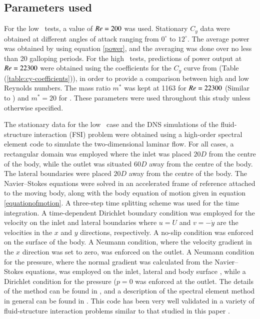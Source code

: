 \subsection{Parameters used} 
  
For the low \reynoldsnumber\ tests, a value of $Re=200$ was used. Stationary $C_y$ data were obtained at different angles of attack ranging from $0^\circ$ to $12^\circ$. The average power was obtained by using equation \ref{power}, and the averaging was done over no less than 20 galloping periods. For the high \reynoldsnumber\ tests, predictions of power output at $Re=22300$ were obtained using the coefficients for the $C_y$  curve from \citet{Parkinson1964} (Table (\ref{table:cy-coefficients})), in order to provide a comparison between high and low Reynolds numbers. The mass ratio $m^*$ was kept at 1163 for $Re=22300$ (Similar to \citet{Parkinson1964}) and $m^*=20$ for . These parameters were used throughout this study unless otherwise specified. 
 
The stationary data for the low \reynoldsnumber\ case and the DNS simulations of the fluid-structure interaction (FSI) problem were obtained using a high-order spectral element code to simulate the two-dimensional laminar flow. For all cases, a rectangular domain was employed where the inlet was placed $20D$ from the centre of the body, while the outlet was situated $60D$ away from the centre of the body. The lateral boundaries were placed $20D$ away from the centre of the body. The Navier--Stokes equations were solved in an accelerated frame of reference attached to the moving body, along with the body equation of motion given in equation \ref{equationofmotion}. A three-step time splitting scheme was used for the time integration. A time-dependent Dirichlet boundary condition was employed for the velocity on the inlet and lateral boundaries where $u=U$ and $v=-\dot{y}$ are the velocities in the $x$ and $y$ directions, respectively. A no-slip condition was enforced on the surface of the body. A Neumann condition, where the velocity gradient in the $x$ direction was set to zero, was enforced on the outlet. A Neumann condition for the pressure, where the normal gradient was calculated from the Navier--Stokes equations, was employed on the inlet, lateral and body surface \citep{gresho1987}, while a Dirichlet condition for the pressure ($p=0$ was enforced at the outlet. The details of the method can be found in \citet{Thompson2006,Thompson1996a}, and a description of the spectral element method in general can be found in \citet{karniadakis2005}. This code has been very well validated in a variety of fluid-structure interaction problems similar to that studied in this paper \citep{Leontini2007a,Griffith2011,Leontini2011,Leontini2013}.
  
